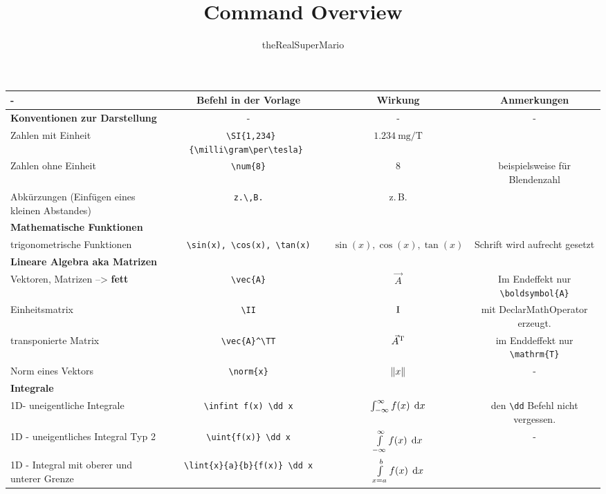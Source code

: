 \documentclass[a4paper]{article}
\title{Command Overview}
\author{theRealSuperMario}
\begin{document}
\maketitle
\begin{abstract}
\end{abstract}

\begin{landscape}
\thispagestyle{empty}
\begin{table}  
	\fontsize{7}{9}\selectfont
	\begin{tabular}{l | c | c | c }
		-		& Befehl in der Vorlage 		& Wirkung 			& Anmerkungen 	\\
		\hline
		\textbf{Konventionen zur Darstellung}	&	-		&		-		&	-	\\
		Zahlen mit Einheit	& \verb| \SI{1,234}{\milli\gram\per\tesla} |	& $ \SI{1,234}{\milli\gram\per\tesla} $	&	 	\\
		Zahlen ohne Einheit	& \verb|\num{8}|	&	$\num{8}$		& beispielsweise für Blendenzahl	\\
		Abkürzungen (Einfügen eines kleinen Abstandes)	& \verb| z.\,B. |	& z.\,B.		&		\\
		
		\textbf{Mathematische Funktionen} &			&				&			\\
		trigonometrische Funktionen  	& \verb| \sin(x), \cos(x), \tan(x) |	& $\sin(x), \cos(x), \tan(x)$	& Schrift wird aufrecht gesetzt \\
		
		\textbf{Lineare Algebra aka Matrizen} &			&				&			\\
		Vektoren, Matrizen --> \textbf{fett}	& \verb|\vec{A}|	& $\vec{A}$			& Im Endeffekt nur \verb|\boldsymbol{A}|	\\
		Einheitsmatrix			& \verb| \II |	&	$\operatorname{I}$	& mit DeclarMathOperator erzeugt. \\
		transponierte Matrix		& \verb| \vec{A}^\TT |	&	$\vec{A}^{\mathrm{T}}$	& im Enddeffekt nur \verb|\mathrm{T}|	\\    
		Norm eines Vektors		& \verb| \norm{x} |		&	$\left\Vert x \right\Vert$ & - \\
		
		\textbf{Integrale}	& 	& 	&  \\
		1D- uneigentliche Integrale 	& \verb+ \infint f(x) \dd x +	& $ \int_{-\infty }^\infty f(x) \;\operatorname{d}\! x $	& den \verb|\dd| Befehl nicht vergessen. \\
		1D - uneigentliches Integral Typ 2	& \verb| \uint{f(x)} \dd x |	& $ \int\limits_{-\infty}^{\infty}{f(x)} \;\operatorname{d}\! x $ 	& - \\
		1D - Integral mit oberer und unterer Grenze	& \verb| \lint{x}{a}{b}{f(x)} \dd x |		& $ \int\limits_{{x}={a}}^{b}{f(x)} \;\operatorname{d}\! x $	&  \\
		

\end{tabular}
\end{table}
\end{landscape}
\end{document}
